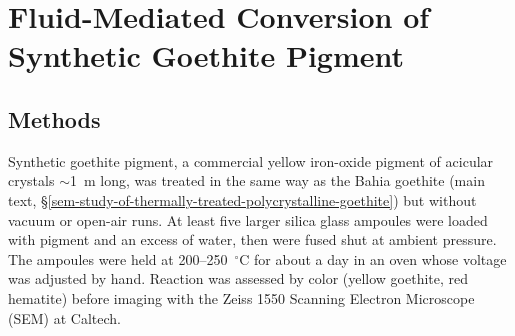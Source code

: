 \begin{table}[htbp]
\centering
\caption{Thermal histories fitted to the $^4$He/$^3$He spectrum of HT-Win-06-01b with the
four-domain structure fixed. Each row gives the best path with a predicted He age of
130--180~Ma along with the reduced $\chi^2$ value ($\nu=22$ for steady cooling and the isothermal hold, $\nu=21$ for burial). 
For steady cooling, $T_\mathrm{max}=T_0$ is reached at crystallization, so $t_\mathrm{peak}=t_\mathrm{form}$. For the isothermal hold,
$T_\mathrm{max}=T_\mathrm{iso}$ throughout. Burial crystallization ages are fixed within each row. The last
three columns give the ranges of the age-consistent paths within the joint 1$\sigma$ region
about the best fit (main text, \S\ref{sec:gt_mdd_methods}).}
\label{tab:ch2-mdd-thermal}
\end{table}

\clearpage
\section{Fluid-Mediated Conversion of Synthetic Goethite Pigment}\label{sec:gt_pigment}

\subsection{Methods}\label{sec:gt_pigment_methods}

Synthetic goethite pigment, a commercial yellow iron-oxide pigment of acicular crystals
$\sim$1~\textmu m long, was treated in the same way as the Bahia goethite
(main text, \S\ref{sem-study-of-thermally-treated-polycrystalline-goethite}) but without vacuum or
open-air runs. At least five larger silica glass ampoules were loaded with pigment and an excess
of water, then were fused shut at ambient pressure. The ampoules were held at 200--250~$^\circ$C 
for about a day in an oven whose voltage was adjusted by hand. Reaction was assessed by color 
(yellow goethite, red hematite) before imaging with the Zeiss 1550 Scanning Electron Microscope
(SEM) at Caltech.

